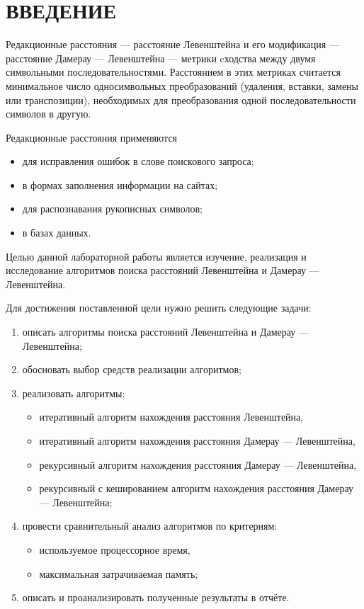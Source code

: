 \section*{ВВЕДЕНИЕ}

Редакционные расстояния --- расстояние Левенштейна и его модификация --- расстояние Дамерау --- Левенштейна --- метрики cходства между двумя символьными последовательностями.
Расстоянием в этих метриках считается минимальное число односимвольных преобразований (удаления, вставки, замены или транспозиции), необходимых для преобразования одной последовательности символов в другую.

Редакционные расстояния применяются 
\begin{itemize}
    \item для исправления ошибок в слове поискового запроса;
    \item в формах заполнения информации на сайтах;
    \item для распознавания рукописных символов;
    \item в базах данных. \cite{ldla}
\end{itemize}

Целью данной лабораторной работы является изучение, реализация и исследование алгоритмов поиска расстояний Левенштейна и Дамерау --- Левенштейна.

Для достижения поставленной цели нужно решить следующие задачи:
\begin{enumerate}
    \item описать алгоритмы поиска расстояний Левенштейна и Дамерау --- Левенштейна;
    \item обосновать выбор средств реализации алгоритмов;
    \item реализовать алгоритмы:
        \begin{itemize}
            \item итеративный алгоритм нахождения расстояния Левенштейна,
            \item итеративный алгоритм нахождения расстояния Дамерау --- Левенштейна,
            \item рекурсивный алгоритм нахождения расстояния Дамерау --- Левенштейна,
            \item рекурсивный с кешированием алгоритм нахождения расстояния Дамерау --- Левенштейна;
        \end{itemize}
    \item провести сравнительный анализ алгоритмов по критериям:
        \begin{itemize}
            \item используемое процессорное время,
            \item максимальная затрачиваемая память;
        \end{itemize}
    \item описать и проанализировать полученные результаты в отчёте.
\end{enumerate} %
